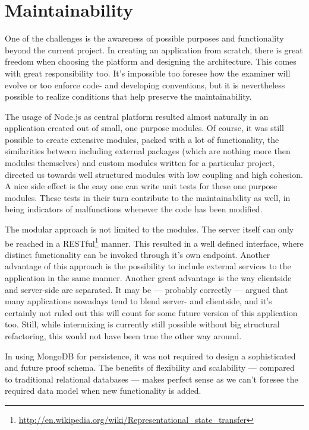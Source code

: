\section{Maintainability}
One of the challenges is the awareness of possible purposes
and functionality beyond the current project. In creating an application from
scratch, there is great freedom when choosing the platform and designing the
architecture. This comes with great responsibility too. It's impossible too
foresee how the \gls{examiner} will evolve or too enforce code- and developing 
conventions, but it is nevertheless possible to realize
conditions that help preserve the maintainability.

The usage of Node.js as central platform resulted almost naturally in an application 
created out of small, one purpose modules. Of course, it was still possible to create
extensive modules, packed with a lot of functionality, the similarities  
between including external packages (which are nothing more then modules themselves) 
and custom modules written for a particular project, directed us towards
well structured modules with low coupling and high cohesion. A nice side effect
is the easy one can write unit tests for these one purpose modules. These tests
in their turn contribute to the maintainability as well, in being indicators of 
malfunctions whenever the code has been modified. 

The modular approach is not limited to the modules. The server itself can only
be reached in a
RESTful\footnote{\url{http://en.wikipedia.org/wiki/Representational_state_transfer}}
manner. This resulted in a well defined interface, where
distinct functionality can be invoked through it's own endpoint. Another
advantage of this approach is the possibility to include external 
services to the application in the same manner. Another great advantage is the
way clientside and server-side are separated. It may be --- probably 
correctly ---
argued that many applications nowadays tend to blend server- and clientside, and
it's certainly not ruled out this will count for some future version of this
application too. Still, while intermixing is currently still possible without
big structural refactoring, this would not have been true the other way around.

In using MongoDB for persistence, it was not required to design a sophisticated
and future proof schema. The benefits of flexibility and scalability 
--- compared to traditional relational databases ---
makes  perfect sense as we can't foresee the required data model when new 
functionality is added.

